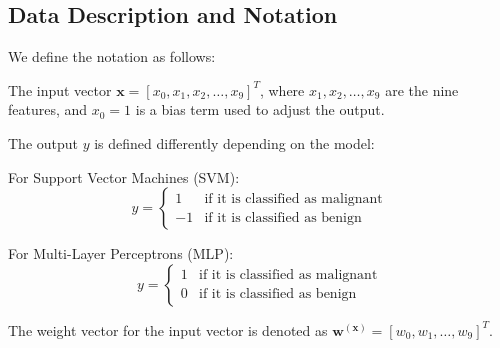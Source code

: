 \subsection{Data Description and Notation}

We define the notation as follows: 

The input vector \hbox{\(\mathbf{x} = [x_0, x_1, x_2, \ldots, x_9]^T\)}, where \(x_1, x_2, \ldots, x_9\) are the nine features, and \(x_0 = 1\) is a bias term used to adjust the output.

The output \(y\) is defined differently depending on the model:

For Support Vector Machines (SVM):
\[
y = 
\begin{cases} 
1 & \text{if it is classified as malignant} \\
-1 & \text{if it is classified as benign}
\end{cases}
\]

For Multi-Layer Perceptrons (MLP):
\[
y = 
\begin{cases} 
1 & \text{if it is classified as malignant} \\
0 & \text{if it is classified as benign}
\end{cases}
\]

The weight vector for the input vector is denoted as \hbox{\(\mathbf{w}^{(\mathbf{x})} = [w_0, w_1, \ldots, w_9]^T\)}.
